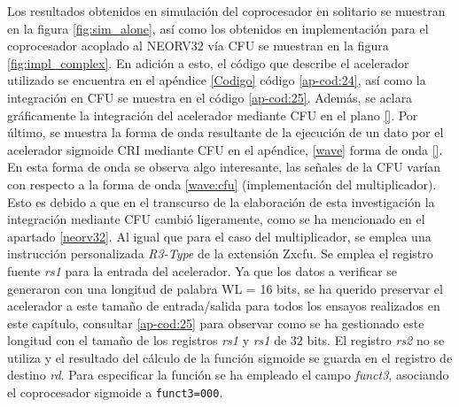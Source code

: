 Los resultados obtenidos en simulación del coprocesador en solitario se muestran en la figura \ref{fig:sim_alone}, así como los obtenidos en implementación para el coprocesador acoplado al NEORV32 vía CFU se muestran en la figura \ref{fig:impl_complex}.
En adición a esto, el código que describe el acelerador utilizado se encuentra en el apéndice \ref{Codigo} código \ref{ap-cod:24}, así como la integración en CFU se muestra en el código \ref{ap-cod:25}.
Además, se aclara gráficamente la integración del acelerador mediante CFU en el plano \ref{}. 
Por último, se muestra la forma de onda resultante de la ejecución de un dato por el acelerador sigmoide CRI mediante CFU en el apéndice, \ref{wave} forma de onda \ref{}. 
En esta forma de onda se observa algo interesante, las señales de la CFU varían con respecto a la forma de onda \ref{wave:cfu} (implementación del multiplicador).
Esto es debido a que en el transcurso de la elaboración de esta investigación la integración mediante CFU cambió ligeramente, como se ha mencionado en el apartado \ref{neorv32}.
Al igual que para el caso del multiplicador, se emplea una instrucción personalizada \textit{R3-Type} de la extensión Zxcfu.
Se emplea el registro fuente \textit{rs1} para la entrada del acelerador.
Ya que los datos a verificar se generaron con una longitud de palabra WL = 16 bits, se ha querido preservar el acelerador a este tamaño de entrada/salida para todos los ensayos realizados en este capítulo, consultar \ref{ap-cod:25} para observar como se ha gestionado este longitud con el tamaño de los registros \textit{rs1} y \textit{rs1} de 32 bits. 
El registro \textit{rs2} no se utiliza y el resultado del cálculo de la función sigmoide se guarda en el registro de destino \textit{rd}.
Para especificar la función se ha empleado el campo \textit{funct3}, asociando el coprocesador sigmoide a \texttt{funct3=000}.


